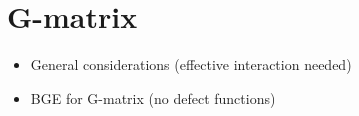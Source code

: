 \section{G-matrix}
\begin{itemize}
\item General considerations (effective interaction needed)
\item BGE for G-matrix (no defect functions)
\end{itemize}
